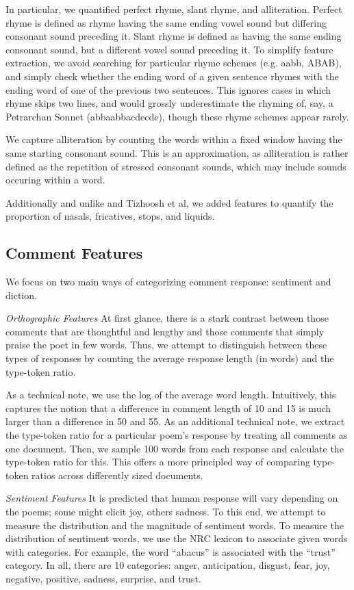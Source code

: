 \documentclass[11pt]{article}
\begin{document}
In particular, we quantified perfect rhyme, slant rhyme, and alliteration. Perfect rhyme is defined as rhyme having the same ending vowel sound but differing consonant sound preceding it. Slant rhyme is defined as having the same ending consonant sound, but a different vowel sound preceding it. To simplify feature extraction, we avoid searching for particular rhyme schemes (e.g. aabb, ABAB), and simply check whether the ending word of a given sentence rhymes with the ending word of one of the previous two sentences. This ignores cases in which rhyme skips two lines, and would grossly underestimate the rhyming of, say, a Petrarchan Sonnet (abbaabbacdecde), though these rhyme schemes appear rarely.

We capture alliteration by counting the words within a fixed window having the same starting consonant sound. This is an approximation, as alliteration is rather defined as the repetition of stressed consonant sounds, which may include sounds occuring within a word.

Additionally and unlike  and Tizhoosh et al, we added features to quantify the proportion of nasals, fricatives, stops, and liquids. 


\subsection*{Comment Features}
We focus on two main ways of categorizing comment response: sentiment and diction.

\emph{Orthographic Features}
At first glance, there is a stark contrast between those comments that are thoughtful and lengthy and those comments that simply praise the poet in few words. Thus, we attempt to distinguish between these types of responses by counting the average response length (in words) and the type-token ratio.

As a technical note, we use the log of the average word length. Intuitively, this captures the notion that a difference in comment length of 10 and 15 is much larger than a difference in 50 and 55. As an additional technical note, we extract the type-token ratio for a particular poem's response by treating all comments as one document. Then, we sample 100 words from each response and calculate the type-token ratio for this. This offers a more principled way of comparing type-token ratios across differently sized documents.

\emph{Sentiment Features}
It is predicted that human response will vary depending on the poems; some might elicit joy, others sadness. To this end, we attempt to measure the distribution and the magnitude of sentiment words. To measure the distribution of sentiment words, we use the NRC lexicon to associate given words with categories. For example, the word ``abacus'' is associated with the ``trust'' category. In all, there are 10 categories: anger, anticipation, disgust, fear, joy, negative, positive, sadness, surprise, and trust.
\end{document}
